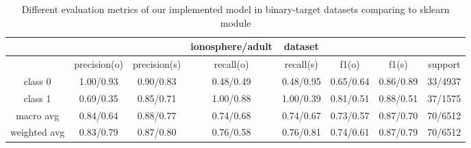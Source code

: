 \documentclass[11pt]{scrartcl}
\begin{document}
\begin{table}[H]

	\begin{tabular}{c|ccccccc}
		\hline
		& &  & ionosphere/adult & dataset & & & \\
		\hline
		& precision(o) & precision(s) & recall(o) & recall(s) & f1(o) & f1(s) & support \\
		\hline
		class 0 &1.00/0.93 &0.90/0.83 &0.48/0.49 &0.48/0.95 &0.65/0.64 &0.86/0.89 &33/4937\\
		class 1 &0.69/0.35 &0.85/0.71 &1.00/0.88 &1.00/0.39 &0.81/0.51&0.88/0.51&37/1575\\
		macro avg &0.84/0.64 &0.88/0.77 &0.74/0.68 &0.74/0.67 &0.73/0.57&0.87/0.70&70/6512\\
		weighted avg &0.83/0.79 &0.87/0.80 &0.76/0.58 &0.76/0.81  &0.74/0.61 &0.87/0.79&70/6512\\

		\hline
	\end{tabular} 
	\caption{Different evaluation metrics of our implemented model in binary-target datasets comparing to sklearn module}
	\label{binary_comparison}
\end{table}
\end{document}
